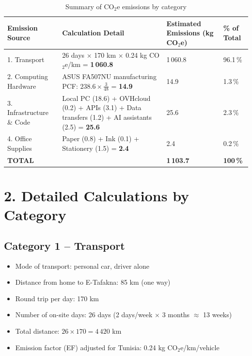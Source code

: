 \begin{table}[H]
\centering
\caption{Summary of CO$_2$e emissions by category}
\renewcommand{\arraystretch}{1.5}
\begin{tabular}{|p{3.5cm}|p{5.5cm}|p{2.5cm}|p{2cm}|}
\hline
\rowcolor{green!25}
\textbf{Emission Source} & \textbf{Calculation Detail} & \textbf{Estimated Emissions (kg CO$_2$e)} & \textbf{\% of Total} \\
\hline
1. Transport & 26 days $\times$ 170 km $\times$ 0.24 kg CO$_2$e/km = \textbf{1\,060.8} & 1\,060.8 & 96.1\,\% \\
\hline
2. Computing Hardware & ASUS FA507NU manufacturing PCF: $238.6 \times \tfrac{3}{48}$ = \textbf{14.9} & 14.9 & 1.3\,\% \\
\hline
3. Infrastructure \& Code & Local PC (18.6) + OVHcloud (0.2) + APIs (3.1) + Data transfers (1.2) + AI assistants (2.5) = \textbf{25.6} & 25.6 & 2.3\,\% \\
\hline
4. Office Supplies & Paper (0.8) + Ink (0.1) + Stationery (1.5) = \textbf{2.4} & 2.4 & 0.2\,\% \\
\hline
\textbf{TOTAL} & & \textbf{1\,103.7} & \textbf{100\,\%} \\
\hline
\end{tabular}
\end{table}

\section*{2. Detailed Calculations by Category}

\subsection*{Category 1 -- Transport}

\begin{itemize}
    \item Mode of transport: personal car, driver alone
    \item Distance from home to E-Tafakna: 85 km (one way)
    \item Round trip per day: 170 km
    \item Number of on-site days: 26 days (2 days/week $\times$ 3 months $\approx$ 13 weeks)
    \item Total distance: $26 \times 170 = 4\,420$ km
    \item Emission factor (EF) adjusted for Tunisia: 0.24 kg CO$_2$e/km/vehicle
\end{itemize}

